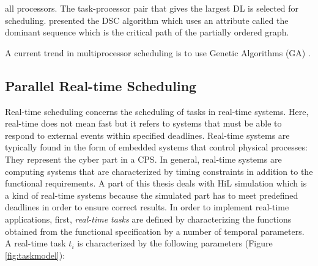 all processors. The task-processor pair that gives the largest DL is selected for scheduling. \cite{yang:1994} presented the DSC algorithm which uses an attribute called the dominant sequence which is the critical path of the partially ordered graph.

A current trend in multiprocessor scheduling is to use Genetic Algorithms (GA) \cite{hou:1994, wu:2004, omara:2010}.

\subsection{Parallel Real-time Scheduling}

Real-time scheduling concerns the scheduling of tasks in real-time systems. Here, real-time does not mean fast but it refers to systems that must be able to respond to external events within specified deadlines. Real-time systems are typically found in the form of embedded systems that control physical processes: They represent the cyber part in a CPS. In general, real-time systems are computing systems that are characterized by timing constraints in addition to the functional requirements. A part of this thesis deals with HiL simulation which is a kind of real-time systems because the simulated part has to meet predefined deadlines in order to ensure correct results.
In order to implement real-time applications, first, \textit{real-time tasks} are defined by characterizing the functions obtained from the functional specification by a number of temporal parameters. A real-time task $t_i$ is characterized by the following parameters (Figure \ref{fig:taskmodel}):
